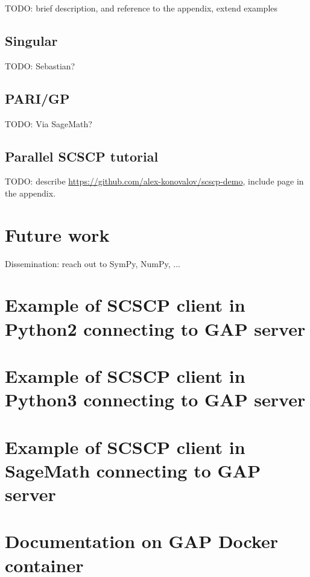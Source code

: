 \documentclass{deliverablereport}
\begin{document}
TODO: brief description, and reference to the appendix, extend examples


\subsection{Singular}

TODO: Sebastian?


\subsection{PARI/GP}

TODO: Via SageMath?


\subsection{Parallel SCSCP tutorial}

TODO: describe \url{https://github.com/alex-konovalov/scscp-demo},
include page in the appendix.

\section{Future work}

Dissemination: reach out to SymPy, NumPy, ...


\printbibliography

\appendix
\section{Example of SCSCP client in Python2 connecting to GAP server}

\section{Example of SCSCP client in Python3 connecting to GAP server}

\section{Example of SCSCP client in SageMath connecting to GAP server}

\section{Documentation on GAP Docker container}

\end{document}
